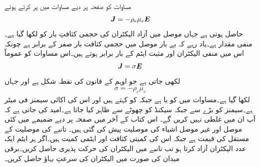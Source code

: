 مساوات  کو صفحہ  پر دیے مساوات  میں پر کرتے ہوئے
\begin{align}
{\ensuremath{{\boldsymbol{J}}}}=-\rho_e \mu_e {{\boldsymbol{E}}}
\end{align}
حاصل ہوتی ہے جہاں موصل میں آزاد الیکٹران کی حجمی کثافتِ بار کو  لکھا گیا ہے۔ منفی مقدار ہے۔یاد رہے کہ بے بار موصل میں حجمی کثافت بار صفر کے برابر ہے چونکہ اس میں منفی الیکٹران  اور مثبت ایٹم کے بار برابر ہوتے ہیں۔اس مساوات کو عموماً
\begin{align}\label{مساوات_کپیسٹر-اوہم_قانون_نقطہ_شکل}
{\ensuremath{{\boldsymbol{J}}}}=\sigma {\ensuremath{{\boldsymbol{E}}}}
\end{align}
لکھی جاتی ہے جو اوہم کے قانون کی نقطہ شکل ہے اور جہاں
\begin{align}\label{مساوات_کپیسٹر_موصلیت_تعریف}
\sigma=-\rho_e \mu_e
\end{align}
لکھا گیا ہے۔مساوات  میں  کو  یا  ہے جبکہ  کو  کہتے ہیں اور اس کی اکائی سیمنز فی میٹر  ہے۔سیمنز کو بڑے  سے  جبکہ سیکنڈ کو چھوٹے  سے ظاہر کیا جاتا ہے۔امید کی جاتی ہے کہ آپ ان میں غلطی نہیں کریں گے۔ اس کتاب کے آخر میں صفحہ  پر دیے ضمیمے میں کئی موصل اور غیر موصل اشیاء کی موصلیت پیش کی گئی ہیں۔
تانبے کی موصلیت کے مستقل  کی قیمت  ہے جبکہ اس کی کمیتی کثافت  اور ایٹمی کمیت  ہیں۔اگر ہر ایٹم ایک عدد الیکٹران آزاد کرتا ہو تب تانبے میں الیکٹران کی حرکت پذیری حاصل کریں۔برقی میدان  کی صورت میں الیکٹران کی  سرعتِ بہاؤ حاصل کریں۔

